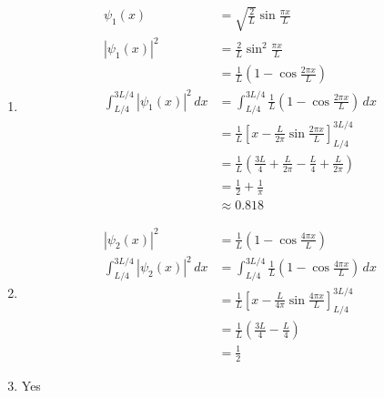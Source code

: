 \documentclass{article}
\begin{document}
\setcounter{subsubsection}{50}
\subsubsection{}

\begin{enumerate}
  \item

        \begin{align*}
          \psi_1(x)                                 & = \sqrt{\frac{2}{L}} \sin \frac{\pi x}{L}                                                    \\
          |\psi_1(x)|^2                             & = \frac{2}{L} \sin^2 \frac{\pi x}{L}                                                         \\
                                                    & = \frac{1}{L} \left( 1 - \cos \frac{2 \pi x}{L} \right)                                      \\
          \int_{L / 4}^{3 L / 4} |\psi_1(x)|^2 \,dx & = \int_{L / 4}^{3 L / 4} \frac{1}{L} \left( 1 - \cos \frac{2 \pi x}{L} \right) \,dx          \\
                                                    & = \frac{1}{L} \left[ x - \frac{L}{2 \pi} \sin \frac{2 \pi x}{L} \right]_{L / 4}^{3 L / 4}    \\
                                                    & = \frac{1}{L} \left( \frac{3 L}{4} + \frac{L}{2 \pi} - \frac{L}{4} + \frac{L}{2 \pi} \right) \\
                                                    & = \frac{1}{2} + \frac{1}{\pi}                                                                \\
                                                    & \approx 0.818
        \end{align*}

  \item

        \begin{align*}
          |\psi_2(x)|^2                             & = \frac{1}{L} \left( 1 - \cos \frac{4 \pi x}{L} \right)                                   \\
          \int_{L / 4}^{3 L / 4} |\psi_2(x)|^2 \,dx & = \int_{L / 4}^{3 L / 4} \frac{1}{L} \left( 1 - \cos \frac{4 \pi x}{L} \right) \,dx       \\
                                                    & = \frac{1}{L} \left[ x - \frac{L}{4 \pi} \sin \frac{4 \pi x}{L} \right]_{L / 4}^{3 L / 4} \\
                                                    & = \frac{1}{L} \left( \frac{3 L}{4} - \frac{L}{4} \right)                                  \\
                                                    & = \frac{1}{2}
        \end{align*}

  \item Yes
\end{enumerate}
\end{document}
